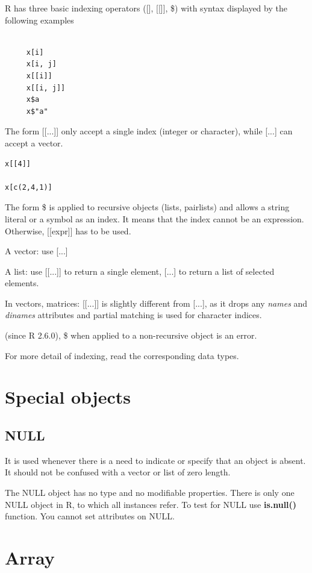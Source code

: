 R has three basic indexing operators ([], [[]], \$) with syntax
displayed by the following examples

\begin{lstlisting}

     x[i]
     x[i, j]
     x[[i]]
     x[[i, j]]
     x$a
     x$"a"
\end{lstlisting}
The form [[...]] only accept a single index (integer or character),
while [...] can accept a vector.
\begin{lstlisting}
x[[4]]

x[c(2,4,1)]
\end{lstlisting}
The form \$ is applied to recursive objects (lists, pairlists) and
allows a string literal or a symbol as an index. It means that the
index cannot be an expression. Otherwise, [[expr]] has to be used.


\textbullet A vector: use [...]

\textbullet A list: use [[...]] to return a single element, [...] to
return a list of selected elements.

\textbullet In vectors, matrices: [[...]] is slightly different from
[...], as it drops any {\it names} and {\it dinames} attributes and
partial matching is used for character indices.

\textbullet (since R 2.6.0), \$ when applied to a non-recursive object
is an error.

For more detail of indexing, read the corresponding data types.

\section{Special objects}
\label{sec:special-objects}

\subsection{NULL}
\label{sec:null}

It is  used whenever there  is a need  to indicate or specify  that an
object is absent.  It should not be confused with a  vector or list of
zero  length.  

The NULL object has no type and no modifiable properties. There is
only one NULL object in R, to which all instances refer.  To test for
NULL use {\bf is.null()} function. You cannot set attributes on NULL.


\section{Array}
\label{sec:array}

